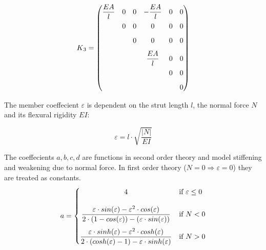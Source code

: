 \begin{equation} \label{K3}
K\textsubscript{3} = \begin{pmatrix}
\dfrac{EA}{l} & 0                   & 0                   & -\dfrac{EA}{l}  & 0                   & 0                   \\[0.8em]
              & 0                   & 0                   & 0               & 0                   & 0                   \\[0.8em]
              &                     & 0                   & 0               & 0                   & 0                   \\[0.8em]
              &                     &                     & \dfrac{EA}{l}   & 0                   & 0                   \\[0.8em]
              &                     &                     &                 & 0                   & 0                   \\[0.8em]
              &                     &                     &                 &                     & 0
     \end{pmatrix}
\end{equation}

The member coeffecient $\varepsilon$ is dependent on the strut length $l$, the normal force $N$ and its flexural rigidity $EI$:

\begin{equation} \label{e}
\varepsilon = l \cdot \sqrt{\frac{|N|}{EI}}
\end{equation}

The coeffecients $a, b, c ,d$ are functions in second order theory and model stiffening and weakening due to normal force.
In first order theory ($N = 0 \Rightarrow \varepsilon = 0$) they are treated as constants.
\begin{equation} \label{a}
    a = \begin{cases}
            \hfil 4              & \text{if } \varepsilon \leq 0\\[1.2em]
            \hfil \dfrac{\varepsilon \cdot sin(\varepsilon) - \varepsilon^2 \cdot cos(\varepsilon)}{2 \cdot (1 - cos(\varepsilon)) - (\varepsilon \cdot sin(\varepsilon))}               & \text{if } N < 0          \\[1.2em]
            \dfrac{\varepsilon \cdot sinh(\varepsilon) - \varepsilon^2 \cdot cosh(\varepsilon)}{2 \cdot (cosh(\varepsilon) - 1) - \varepsilon \cdot sinh(\varepsilon)}               & \text{if } N > 0
        \end{cases}
\end{equation}

